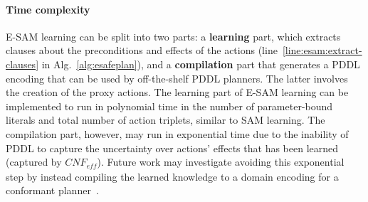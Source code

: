 \documentclass{article}
\newcommand{\eff}{\textit{eff}}
\newcommand{\cnf}{\textit{CNF}}
\begin{document}
\paragraph{Time complexity}
E-SAM learning can be split into two parts: a \textbf{learning} part, which extracts clauses about the preconditions and effects of the actions (line~\ref{line:esam:extract-clauses} in Alg.~\ref{alg:esafeplan}), and a \textbf{compilation} part that generates a PDDL encoding that can be used by off-the-shelf PDDL planners. The latter involves the creation of the proxy actions. 
The learning part of E-SAM learning can be implemented to run in polynomial time in the number of parameter-bound literals and total number of action triplets, similar to SAM learning. 
The compilation part, however, may run in exponential time due to the 
 inability of PDDL to capture the uncertainty over actions' effects that has been learned (captured by $\cnf_\eff$). 
 Future work may investigate avoiding this exponential step by instead compiling the learned knowledge to a domain encoding for a conformant planner~\cite{bonet2010conformant}. 



\end{document}
